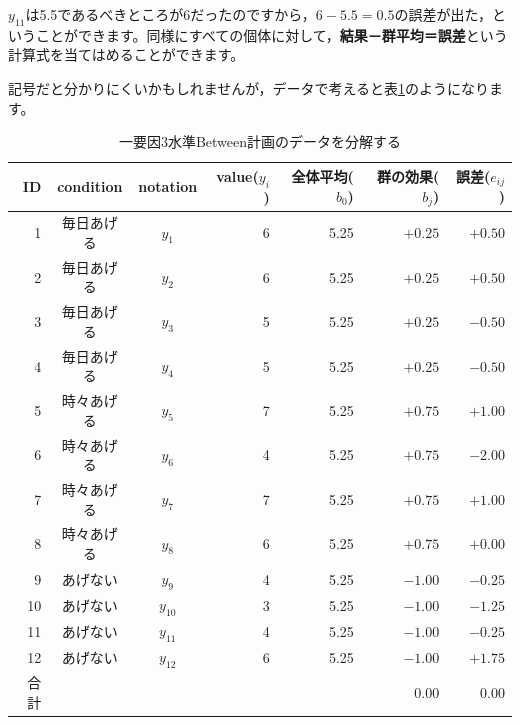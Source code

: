 \documentclass{ltjbook}
\begin{document}
$y_{11}$は5.5であるべきところが6だったのですから，$6-5.5=0.5$の誤差が出た，ということができます。同様にすべての個体に対して，\textbf{結果－群平均＝誤差}という計算式を当てはめることができます。

記号だと分かりにくいかもしれませんが，データで考えると表\ref{table::21_03}のようになります。
\begin{table}[ht]
	\centering
	\caption{一要因3水準Between計画のデータを分解する}
	\begin{tabular}{rccrrrr}
		\hline
		ID & condition & notation & value($y_{i}$) & 全体平均($b_0$) & 群の効果($b_j$) & 誤差($e_{ij}$) \\
		\hline
		1  & 毎日あげる     & $y_{1}$  & 6              & 5.25        & $+0.25$     & $+0.50$      \\
		2  & 毎日あげる     & $y_{2}$  & 6              & 5.25        & $+0.25$     & $+0.50$      \\
		3  & 毎日あげる     & $y_{3}$  & 5              & 5.25        & $+0.25$     & $-0.50$      \\
		4  & 毎日あげる     & $y_{4}$  & 5              & 5.25        & $+0.25$     & $-0.50$      \\
		5  & 時々あげる     & $y_{5}$  & 7              & 5.25        & $+0.75$     & $+1.00$      \\
		6  & 時々あげる     & $y_{6}$  & 4              & 5.25        & $+0.75$     & $-2.00$      \\
		7  & 時々あげる     & $y_{7}$  & 7              & 5.25        & $+0.75$     & $+1.00$      \\
		8  & 時々あげる     & $y_{8}$  & 6              & 5.25        & $+0.75$     & $+0.00$      \\
		9  & あげない      & $y_{9}$  & 4              & 5.25        & $-1.00$     & $-0.25$      \\
		10 & あげない      & $y_{10}$ & 3              & 5.25        & $-1.00$     & $-1.25$      \\
		11 & あげない      & $y_{11}$ & 4              & 5.25        & $-1.00$     & $-0.25$      \\
		12 & あげない      & $y_{12}$ & 6              & 5.25        & $-1.00$     & $+1.75$      \\
		\hline\hline
		合計 &           &          &                &             & 0.00        & 0.00         \\\hline
	\end{tabular}
	\label{table::21_03}
\end{table}
\end{document}
